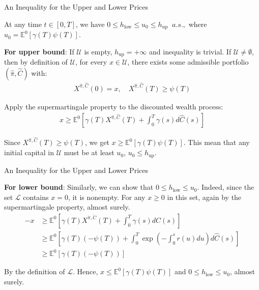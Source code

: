 \documentclass{beamer}
\begin{document}
\begin{frame}{An Inequality for the Upper and Lower Prices}

    {\footnotesize \footnotesize
    \par At any time $t \in [0, T]$, we have $ 0 \leq h_{\text{low}} \leq u_0 \leq h_{\text{up}}\;\; a.s.,$ where $u_0 = \mathbb{E}^0[\gamma(T)\psi(T)]$.
    \vspace{1em}
    \par \textbf{For upper bound}: If $\mathcal{U}$ is empty, $h_{\text{up}} = +\infty$ and inequality is trivial. If $\mathcal{U} \neq \emptyset$, then by definition of $\mathcal{U}$, for every $x \in \mathcal{U}$,
     there exists some admissible portfolio $(\hat{\pi}, \hat{C})$ with:
     \begin{align*}
        X^{\hat{\pi}, \hat{C}}(0) = x, \quad X^{\hat{\pi}, \hat{C}}(T) \geq \psi(T)
     \end{align*}
     \par  \pause Apply the supermartingale property to the discounted wealth process:
     \begin{align*}
        x \geq \mathbb{E}^0 \left[ \gamma(T) X^{\hat{\pi}, \hat{C}}(T) + \int_0^T \gamma(s) d\hat{C}(s) \right]
     \end{align*}
     \par Since $X^{\hat{\pi}, \hat{C}}(T) \geq \psi(T)$, we get $ x \geq \mathbb{E}^0 [\gamma(T) \psi(T)]$. 
     This mean that any initial capital in $\mathcal{U}$ must be at least $u_0$, $ u_0 \leq h_{\text{up}}$.
    
    }
\end{frame} 

\begin{frame}{An Inequality for the Upper and Lower Prices}

    {\footnotesize \footnotesize
    \par \textbf{For lower bound}: Similarly, we can show that $0 \leq h_{\text{low}} \leq u_0$. Indeed, since the set $\mathcal{L}$ contains $x = 0$,
     it is nonempty. For any $x \geq 0$ in this set, again by the supermartingale property, almost surely.
      \pause 
     \begin{align*}
        -x &\geq \mathbb{E}^0 \left[ \gamma(T) X^{\check{\pi}, \check{C}}(T) + \int_0^T \gamma(s) d\hat{C}(s) \right] \\
        &\geq \mathbb{E}^0 \left[ \gamma(T) (-\psi(T)) + \int_0^T \exp \left( - \int_0^s r(u) du \right) d\hat{C}(s) \right] \\
        &\geq \mathbb{E}^0 \left[ \gamma(T) (-\psi(T)) \right]
        \end{align*}
        \vspace{1em}
    \par By the definition of $\mathcal{L}$. Hence, $x \leq \mathbb{E}^0 \left[ \gamma(T) \psi(T) \right]$ and $0 \leq h_{\text{low}} \leq u_0$, almost surely.
    

    }
\end{frame} 
\end{document}

